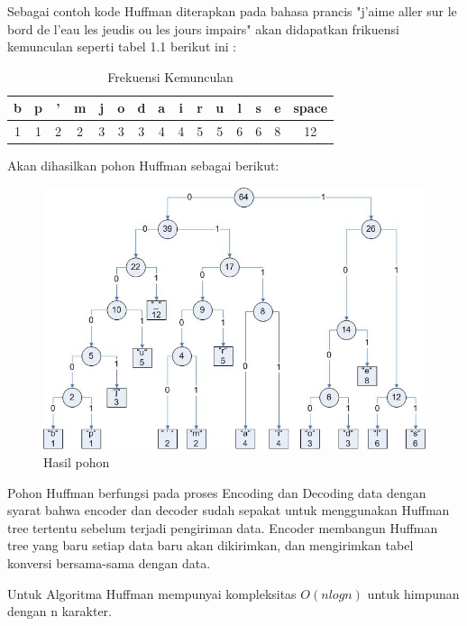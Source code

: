 Sebagai contoh kode Huffman diterapkan pada bahasa prancis "j'aime aller sur le bord de l'eau les jeudis ou les jours impairs" akan didapatkan frikuensi kemunculan seperti tabel 1.1  berikut ini :

\begin{table}[h]
\begin{center}
\begin{tabular}{|c|c|c|c|c|c|c|c|c|c|c|c|c|c|c|}
\hline
b&p&'&m&j&o&d&a&i&r&u&l&s&e&space\\
\hline
1&1&2&2&3&3&3&4&4&5&5&6&6&8&12\\
\hline
\end{tabular}
\caption{Frekuensi Kemunculan}
\end{center}
\end{table}

Akan dihasilkan pohon Huffman sebagai berikut:

\begin{figure}[htbp]
\begin{center}
	\includegraphics[scale=0.6]{fig/sunario-3/Huffman.jpg}%
	\caption{Hasil pohon }%
	\label{fig:Huffman Tree}%
\end{center}
\end{figure}

Pohon Huffman berfungsi pada proses Encoding dan Decoding data dengan syarat bahwa encoder dan decoder sudah sepakat untuk menggunakan Huffman tree tertentu sebelum terjadi pengiriman data. Encoder membangun Huffman tree yang baru setiap data baru akan dikirimkan, dan mengirimkan tabel konversi bersama-sama dengan data.

Untuk Algoritma Huffman mempunyai kompleksitas $O(n log n)$ untuk himpunan dengan n karakter.	


